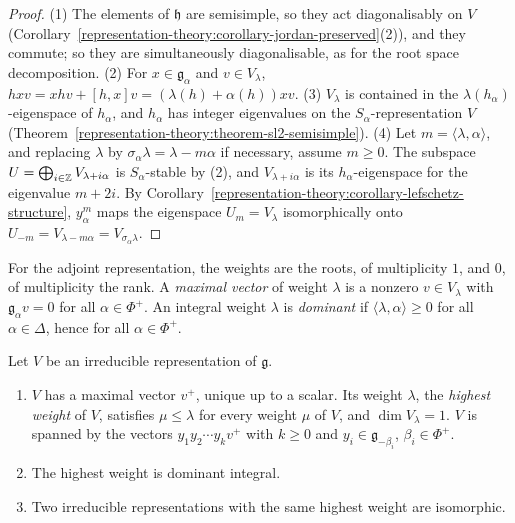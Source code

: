 \begin{proof}
(1) The elements of $\mathfrak{h}$ are semisimple, so they act diagonalisably on $V$ (Corollary~\ref{representation-theory:corollary-jordan-preserved}(2)), and they commute; so they
are simultaneously diagonalisable, as for the root space decomposition. (2) For $x \in \mathfrak{g}_\alpha$ and $v \in V_\lambda$, $hxv = xhv + [h, x]v = (\lambda(h) + \alpha(h))xv$.
(3) $V_\lambda$ is contained in the $\lambda(h_\alpha)$-eigenspace of $h_\alpha$, and $h_\alpha$ has integer eigenvalues on the $S_\alpha$-representation $V$
(Theorem~\ref{representation-theory:theorem-sl2-semisimple}). (4) Let $m = \langle\lambda, \alpha\rangle$, and replacing $\lambda$ by $\sigma_\alpha\lambda = \lambda - m\alpha$ if necessary,
assume $m \geq 0$. The subspace $U = \bigoplus_{i \in \mathbb{Z}}V_{\lambda + i\alpha}$ is $S_\alpha$-stable by (2), and $V_{\lambda + i\alpha}$ is its $h_\alpha$-eigenspace for the eigenvalue
$m + 2i$. By Corollary~\ref{representation-theory:corollary-lefschetz-structure}, $y_\alpha^m$ maps the eigenspace $U_m = V_\lambda$ isomorphically onto $U_{-m} = V_{\lambda - m\alpha} =
V_{\sigma_\alpha\lambda}$.
\end{proof}

For the adjoint representation, the weights are the roots, of multiplicity $1$, and $0$, of multiplicity the rank. A \emph{maximal vector} of weight $\lambda$ is a nonzero $v \in V_\lambda$ with
$\mathfrak{g}_\alpha v = 0$ for all $\alpha \in \Phi^+$. An integral weight $\lambda$ is \emph{dominant} if $\langle\lambda, \alpha\rangle \geq 0$ for all $\alpha \in \Delta$, hence for all
$\alpha \in \Phi^+$.

\begin{theorem}\label{representation-theory:theorem-highest-weight}
Let $V$ be an irreducible representation of $\mathfrak{g}$.
\begin{enumerate}
\item $V$ has a maximal vector $v^+$, unique up to a scalar. Its weight $\lambda$, the \emph{highest weight} of $V$, satisfies $\mu \leq \lambda$ for every weight $\mu$ of $V$, and
$\dim V_\lambda = 1$. $V$ is spanned by the vectors $y_1y_2\cdots y_kv^+$ with $k \geq 0$ and $y_i \in \mathfrak{g}_{-\beta_i}$, $\beta_i \in \Phi^+$.
\item The highest weight is dominant integral.
\item Two irreducible representations with the same highest weight are isomorphic.
\end{enumerate}
\end{theorem}

